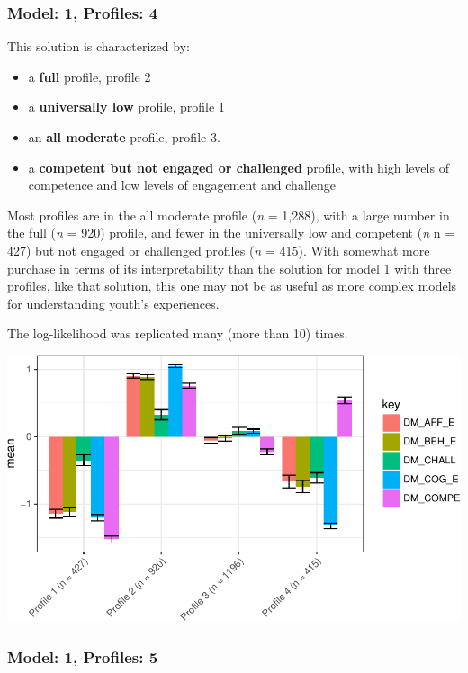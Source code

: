 \documentclass[]{book}
\providecommand{\tightlist}{%
  \setlength{\itemsep}{0pt}\setlength{\parskip}{0pt}}
\theoremstyle{definition}
\theoremstyle{definition}
\theoremstyle{definition}
\theoremstyle{remark}
\begin{document}
\subsubsection{Model: 1, Profiles: 4}\label{model-1-profiles-4}

This solution is characterized by:

\begin{itemize}
\tightlist
\item
  a \textbf{full} profile, profile 2
\item
  a \textbf{universally low} profile, profile 1
\item
  an \textbf{all moderate} profile, profile 3.
\item
  a \textbf{competent but not engaged or challenged} profile, with high
  levels of competence and low levels of engagement and challenge
\end{itemize}

Most profiles are in the all moderate profile (\emph{n} = 1,288), with a
large number in the full (\emph{n} = 920) profile, and fewer in the
universally low and competent (\emph{n} n = 427) but not engaged or
challenged profiles (\emph{n} = 415). With somewhat more purchase in
terms of its interpretability than the solution for model 1 with three
profiles, like that solution, this one may not be as useful as more
complex models for understanding youth's experiences.

The log-likelihood was replicated many (more than 10) times.

\begin{center}\includegraphics[width=0.8\linewidth]{rosenberg-dissertation_files/figure-latex/m1_4p-1} \end{center}

\subsubsection{Model: 1, Profiles: 5}\label{model-1-profiles-5}
\end{document}
